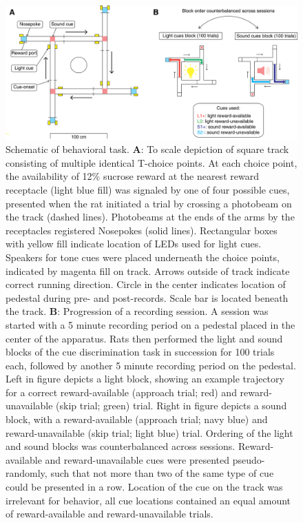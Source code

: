 \documentclass[11pt]{article}
\newcommand{\bsf}[1]{\textbf{#1}}
\begin{document}
\begin{figure}[h]
\centering
\includegraphics[width=\textwidth]{Fig 2 - Schematic task.png}
\caption{Schematic of behavioral task. \bsf{A}: To scale depiction of square
track consisting of multiple identical T-choice points. At each choice point,
the availability of 12\% sucrose reward at the nearest reward receptacle (light
blue fill) was signaled by one of four possible cues, presented when the rat
initiated a trial by crossing a photobeam on the track (dashed
lines). Photobeams at the ends of the arms by the receptacles registered
Nosepokes (solid lines). Rectangular boxes with yellow fill indicate location of LEDs used
for light cues. Speakers for tone cues were placed underneath the choice
points, indicated by magenta fill on track. Arrows outside of track indicate correct running direction. Circle in the center indicates location of pedestal during pre- and post-records. Scale bar is located beneath the track. \bsf{B}: Progression of
a recording session. A session was started with a 5 minute recording period on
a pedestal placed in the center of the apparatus. Rats then performed the light and sound blocks of the cue discrimination task in succession for 100 trials each, followed by another 5 minute recording period on the pedestal. Left in figure depicts a light block, showing an
example trajectory for a correct reward-available (approach trial; red) and reward-unavailable
(skip trial; green) trial. Right in figure depicts a sound block, with a reward-available
(approach trial; navy blue) and reward-unavailable (skip trial; light blue) trial. Ordering of the light and sound blocks was counterbalanced across sessions. Reward-available and reward-unavailable cues were presented pseudo-randomly, such that not more than two of the same type of cue could be presented in a row. Location of the cue on the track was irrelevant for
behavior, all cue locations contained an equal amount of reward-available and
reward-unavailable trials.
}
\label{fig:task}
\end{figure}
\end{document}
